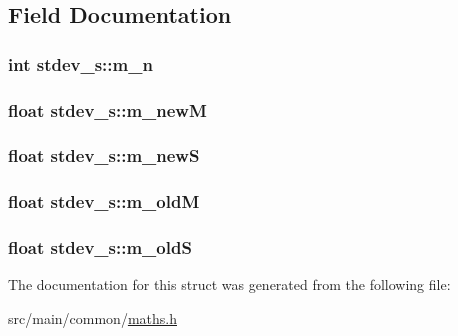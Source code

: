 \subsection{Field Documentation}
\hypertarget{structstdev__s_ae346e5cb7da1415967ea2314bcc11a30}{
\subsubsection[{m\+\_\+n}]{\setlength{\rightskip}{0pt plus 5cm}int stdev\+\_\+s\+::m\+\_\+n}}\label{structstdev__s_ae346e5cb7da1415967ea2314bcc11a30}
\hypertarget{structstdev__s_af30f207db255dc25d5ae7b008a8e147d}{
\subsubsection[{m\+\_\+new\+M}]{\setlength{\rightskip}{0pt plus 5cm}float stdev\+\_\+s\+::m\+\_\+new\+M}}\label{structstdev__s_af30f207db255dc25d5ae7b008a8e147d}
\hypertarget{structstdev__s_ac31e66ce25dbf8e36ec279a0ac0018a5}{
\subsubsection[{m\+\_\+new\+S}]{\setlength{\rightskip}{0pt plus 5cm}float stdev\+\_\+s\+::m\+\_\+new\+S}}\label{structstdev__s_ac31e66ce25dbf8e36ec279a0ac0018a5}
\hypertarget{structstdev__s_a5c2baaa26c3cdfa7387eb074e7de8e71}{
\subsubsection[{m\+\_\+old\+M}]{\setlength{\rightskip}{0pt plus 5cm}float stdev\+\_\+s\+::m\+\_\+old\+M}}\label{structstdev__s_a5c2baaa26c3cdfa7387eb074e7de8e71}
\hypertarget{structstdev__s_a77992b92cc7efdee4809637517d5491a}{
\subsubsection[{m\+\_\+old\+S}]{\setlength{\rightskip}{0pt plus 5cm}float stdev\+\_\+s\+::m\+\_\+old\+S}}\label{structstdev__s_a77992b92cc7efdee4809637517d5491a}


The documentation for this struct was generated from the following file\+:\begin{DoxyCompactItemize}
\item 
src/main/common/\hyperlink{maths_8h}{maths.\+h}\end{DoxyCompactItemize}
